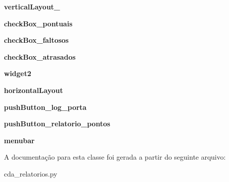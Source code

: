 \begin{DoxyCompactItemize}
\item 
\hypertarget{classcda__relatorios_1_1Ui__Relatorios__Window_a665e73d35626965e3f4bc063ca8ff6be}{{\bfseries vertical\-Layout\-\_}}\label{classcda__relatorios_1_1Ui__Relatorios__Window_a665e73d35626965e3f4bc063ca8ff6be}

\item 
\hypertarget{classcda__relatorios_1_1Ui__Relatorios__Window_a4f809de9370d0c9ad016fe8104d259bc}{{\bfseries check\-Box\-\_\-pontuais}}\label{classcda__relatorios_1_1Ui__Relatorios__Window_a4f809de9370d0c9ad016fe8104d259bc}

\item 
\hypertarget{classcda__relatorios_1_1Ui__Relatorios__Window_ac2bf13a3908efa26ad216df6415f9171}{{\bfseries check\-Box\-\_\-faltosos}}\label{classcda__relatorios_1_1Ui__Relatorios__Window_ac2bf13a3908efa26ad216df6415f9171}

\item 
\hypertarget{classcda__relatorios_1_1Ui__Relatorios__Window_aff919fc12b827f6964cadc549778e25f}{{\bfseries check\-Box\-\_\-atrasados}}\label{classcda__relatorios_1_1Ui__Relatorios__Window_aff919fc12b827f6964cadc549778e25f}

\item 
\hypertarget{classcda__relatorios_1_1Ui__Relatorios__Window_abb6682d1f0c66e3d35e879bd17cc71eb}{{\bfseries widget2}}\label{classcda__relatorios_1_1Ui__Relatorios__Window_abb6682d1f0c66e3d35e879bd17cc71eb}

\item 
\hypertarget{classcda__relatorios_1_1Ui__Relatorios__Window_a7060bc318ab80c2b6bb339679fd0a71a}{{\bfseries horizontal\-Layout}}\label{classcda__relatorios_1_1Ui__Relatorios__Window_a7060bc318ab80c2b6bb339679fd0a71a}

\item 
\hypertarget{classcda__relatorios_1_1Ui__Relatorios__Window_a61ed465b9db2ff49bc273f05f413d92c}{{\bfseries push\-Button\-\_\-log\-\_\-porta}}\label{classcda__relatorios_1_1Ui__Relatorios__Window_a61ed465b9db2ff49bc273f05f413d92c}

\item 
\hypertarget{classcda__relatorios_1_1Ui__Relatorios__Window_a52ec967367d5faf2b2b35e3da8b3442a}{{\bfseries push\-Button\-\_\-relatorio\-\_\-pontos}}\label{classcda__relatorios_1_1Ui__Relatorios__Window_a52ec967367d5faf2b2b35e3da8b3442a}

\item 
\hypertarget{classcda__relatorios_1_1Ui__Relatorios__Window_ad5c11b47556a7ff5c693fae8d9c9d9cf}{{\bfseries menubar}}\label{classcda__relatorios_1_1Ui__Relatorios__Window_ad5c11b47556a7ff5c693fae8d9c9d9cf}

\end{DoxyCompactItemize}


\-A documentação para esta classe foi gerada a partir do seguinte arquivo\-:\begin{DoxyCompactItemize}
\item 
cda\-\_\-relatorios.\-py\end{DoxyCompactItemize}
